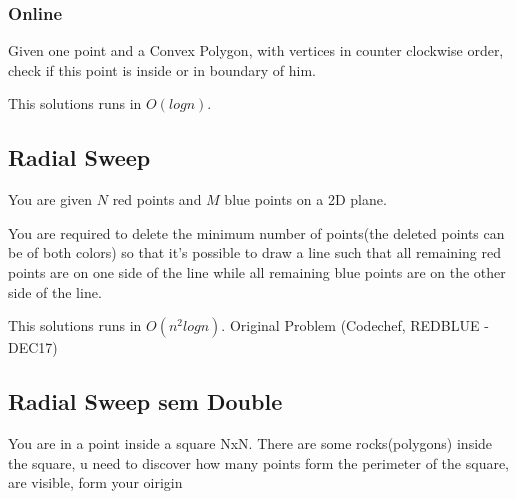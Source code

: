             
            \subsubsection{Online}
            Given one point and a Convex Polygon, with vertices in counter clockwise order, check if this point is inside or in boundary of him.
            
            This solutions runs in $O(logn)$.
            
        
        
        \subsection{Radial Sweep}
        You are given $N$ red points and $M$ blue points on a 2D plane.

        You are required to delete the minimum number of points(the deleted points can be of both colors) so that it's possible to draw a line such that all remaining red points are on one side of the line while all remaining blue points are on the other side of the line.
        
        This solutions runs in $O(n^2logn)$. Original Problem (Codechef, REDBLUE - DEC17)
        
        \subsection{Radial Sweep sem Double}
        You are in a point inside a square NxN. There are some rocks(polygons) inside the square, u need to discover how many points form the perimeter of the square, are visible, form your oirigin
    
